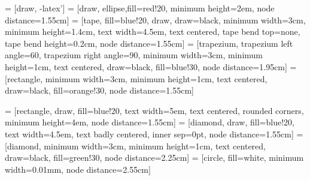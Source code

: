 \documentclass[a4paper,12pt]{article} %
\begin{document}
 = [draw, -latex']
 = [draw, ellipse,fill=red!20, minimum height=2em, node distance=1.55cm]
 = [tape, fill=blue!20, draw, draw=black, minimum width=3cm, minimum height=1.4cm, text width=4.5em, text centered, tape bend top=none, tape bend height=0.2cm, node distance=1.55cm]
 = [trapezium, trapezium left angle=60, trapezium right angle=90, minimum width=3cm, minimum height=1cm, text centered, draw=black, fill=blue!30, node distance=1.95cm]
 = [rectangle, minimum width=3cm, minimum height=1cm, text centered, draw=black, fill=orange!30, node distance=1.55cm]

 = [rectangle, draw, fill=blue!20, text width=5em, text centered, rounded corners, minimum height=4em, node distance=1.55cm]
 = [diamond, draw, fill=blue!20, text width=4.5em, text badly centered, inner sep=0pt, node distance=1.55cm]
 = [diamond, minimum width=3cm, minimum height=1cm, text centered, draw=black, fill=green!30, node distance=2.25cm]
 = [circle, fill=white, minimum width=0.01mm, node distance=2.55cm]


\clearpage %
\end{document}
